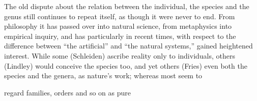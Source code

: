 \documentclass[12pt,a4paper]{book}
\begin{document}
The old dispute about the relation between the individual, the species and the
genus still continues to repeat itself, as though it were never to end. From
philosophy it has passed over into natural science, from metaphysics into
empirical inquiry, and has particularly in recent times, with respect to the
difference between ``the artificial'' and ``the natural systems,'' gained
heightened interest. While some (Schleiden) ascribe reality only to
individuals, others (Lindley) would conceive the species too, and yet others
(Fries) even both the species and the genera, as nature's work; whereas most
seem to

\setcounter{footnote}{0}
regard families, orders and so on as pure
\end{document}
